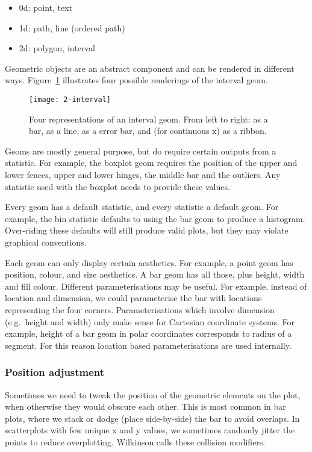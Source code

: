 \begin{itemize}
	\item 0d: point, text
	\item 1d: path, line (ordered path)
	\item 2d: polygon, interval
\end{itemize}

Geometric objects are an abstract component and can be rendered in different ways. Figure~\ref{fig:interval} illustrates four possible renderings of the interval geom. 

\begin{figure}[htbp]
	\centering
		\texttt{[image: 2-interval]}
	\caption{Four representations of an interval geom.  From left to right: as a bar, as a line, as a error bar, and (for continuous x) as a ribbon.}
	\label{fig:interval}
\end{figure}

Geoms are mostly general purpose, but do require certain outputs from a statistic.  For example, the boxplot geom requires the position of the upper and lower fences, upper and lower hinges, the middle bar and the outliers. Any statistic used with the boxplot needs to provide these values. 

Every geom has a default statistic, and every statistic a default geom.  For example, the bin statistic defaults to using the bar geom to produce a histogram.  Over-riding these defaults will still produce valid plots, but they may violate graphical conventions.

Each geom can only display certain aesthetics.  For example, a point geom has position, colour, and size aesthetics.  A bar geom has all those, plus height, width and fill colour.  Different parameterisations may be useful.  For example, instead of location and dimension, we could parameterise the bar with locations representing the four corners.  Parameterisations which involve dimension (e.g.\ height and width) only make sense for Cartesian coordinate systems.  For example, height of a bar geom in polar coordinates corresponds to radius of a segment.  For this reason location based parameterisations are used internally.  

\subsubsection{Position adjustment}

Sometimes we need to tweak the position of the geometric elements on the plot, when otherwise they would obscure each other.  This is most common in bar plots, where we stack or dodge (place side-by-side) the bar to avoid overlaps.  In scatterplots with few unique x and y values, we sometimes randomly jitter \citep{chambers:1983} the points to reduce overplotting.  Wilkinson calls these collision modifiers.

